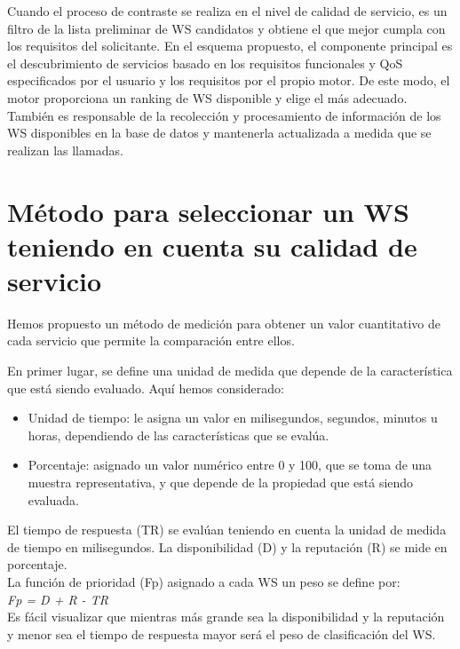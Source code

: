 Cuando el proceso de contraste se realiza en el nivel de calidad de servicio, es un filtro de la lista preliminar de WS candidatos y obtiene el que mejor cumpla con los requisitos del solicitante.
En el esquema propuesto, el componente principal es el descubrimiento de servicios basado en los requisitos funcionales y QoS especificados por el usuario y los requisitos por el propio motor. De este modo, el motor proporciona un ranking de WS disponible y elige el más adecuado. También es responsable de la recolección y procesamiento de información de los WS disponibles en la base de datos y mantenerla actualizada a medida que se realizan las llamadas.

\section{Método para seleccionar un WS teniendo en cuenta su calidad de servicio}
\label{Método para seleccionar un WS teniendo en cuenta su calidad de servicio}

Hemos propuesto un método de medición para obtener un valor cuantitativo de cada servicio que permite la comparación entre ellos.


En primer lugar, se define una unidad de medida que depende de la característica que está siendo evaluado. Aquí hemos considerado:
\begin{itemize}
	\item Unidad de tiempo: le asigna un valor en milisegundos, segundos, minutos u horas, dependiendo de las características que se evalúa.
	\item Porcentaje: asignado un valor numérico entre 0 y 100, que se toma de una muestra representativa, y que depende de la propiedad que está siendo evaluada.
\end{itemize}
El tiempo de respuesta (TR) se evalúan teniendo en cuenta la unidad de medida de tiempo en milisegundos. La disponibilidad (D) y la reputación (R) se mide en porcentaje.\\

La función de prioridad (Fp) asignado a cada WS un peso se define por:\\

\emph{Fp = D + R - TR}\\

Es fácil visualizar que mientras más grande sea la disponibilidad y la reputación y menor sea el tiempo de respuesta mayor será el peso de clasificación del WS.\\

